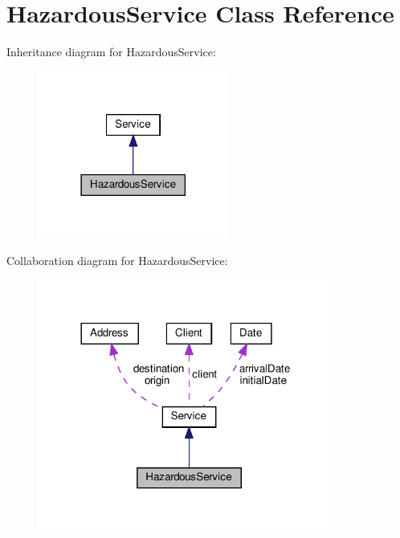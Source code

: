 \hypertarget{class_hazardous_service}{}\section{Hazardous\+Service Class Reference}
\label{class_hazardous_service}


Inheritance diagram for Hazardous\+Service\+:\nopagebreak
\begin{figure}[H]
\begin{center}
\leavevmode
\includegraphics[width=177pt]{class_hazardous_service__inherit__graph}
\end{center}
\end{figure}


Collaboration diagram for Hazardous\+Service\+:\nopagebreak
\begin{figure}[H]
\begin{center}
\leavevmode
\includegraphics[width=276pt]{class_hazardous_service__coll__graph}
\end{center}
\end{figure}
